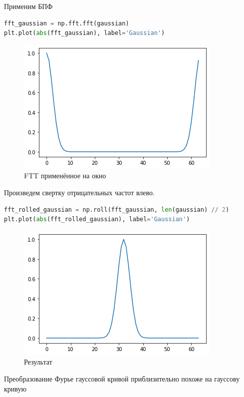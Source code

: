 Применим БПФ

\begin{lstlisting}[language=Python]
fft_gaussian = np.fft.fft(gaussian)
plt.plot(abs(fft_gaussian), label='Gaussian')
\end{lstlisting}
\begin{figure}[H]
	\begin{center}
		\includegraphics[scale=1]{fig/lab08/lab08_05.png}
		\caption{FTT применённое на окно}
	\end{center}
\end{figure}

Произведем свертку отрицательных частот влево.

\begin{lstlisting}[language=Python]
fft_rolled_gaussian = np.roll(fft_gaussian, len(gaussian) // 2)
plt.plot(abs(fft_rolled_gaussian), label='Gaussian')
\end{lstlisting}
\begin{figure}[H]
	\begin{center}
		\includegraphics[scale=1]{fig/lab08/lab08_06.png}
		\caption{Результат}
	\end{center}
\end{figure}

Преобразование Фурье гауссовой кривой приблизительно похоже на гауссову кривую


